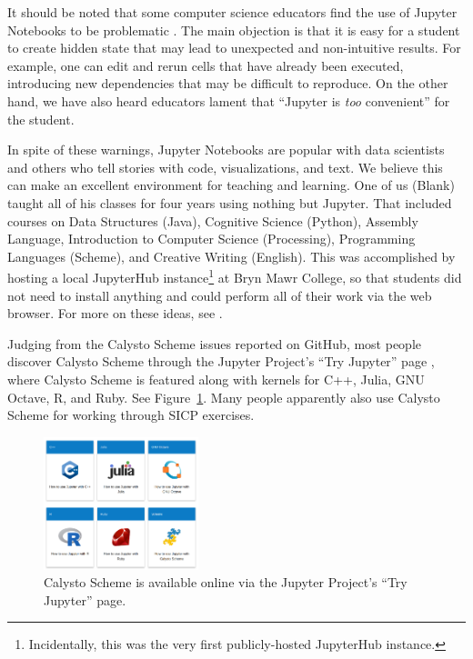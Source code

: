 \documentclass[acmsmall,screen,authorversion]{acmart}
\begin{document}

It should be noted that some computer science educators find the use of Jupyter
Notebooks to be problematic \cite{Johnson2020}. The main objection is that it
is easy for a student to create hidden state that may lead to unexpected and
non-intuitive results. For example, one can edit and rerun cells that have
already been executed, introducing new dependencies that may be difficult to
reproduce. On the other hand, we have also heard educators lament that
``Jupyter is \emph{too} convenient'' for the student.

In spite of these warnings, Jupyter Notebooks are popular with data scientists
and others who tell stories with code, visualizations, and text. We believe
this can make an excellent environment for teaching and learning. One of us
(Blank) taught all of his classes for four years using nothing but
Jupyter. That included courses on Data Structures (Java), Cognitive Science
(Python), Assembly Language, Introduction to Computer Science (Processing),
Programming Languages (Scheme), and Creative Writing (English). This was
accomplished by hosting a local JupyterHub instance\footnote[3]{Incidentally,
  this was the very first publicly-hosted JupyterHub instance.} at Bryn Mawr
College, so that students did not need to install anything and could perform
all of their work via the web browser. For more on these ideas, see
\cite{Calico2}.

Judging from the Calysto Scheme issues reported on GitHub, most people discover
Calysto Scheme through the Jupyter Project's ``Try Jupyter'' page
\cite{TryJupyter}, where Calysto Scheme is featured along with kernels for C++,
Julia, GNU Octave, R, and Ruby. See Figure~\ref{fig:try-jupyter}. Many people
apparently also use Calysto Scheme for working through SICP exercises.


\begin{figure}[h]
  \centering
  \includegraphics[width=0.4\textwidth]{try-jupyter.png}
  \caption{Calysto Scheme is available online via the Jupyter Project's ``Try Jupyter'' page.}
  \label{fig:try-jupyter}
\end{figure}
\end{document}
